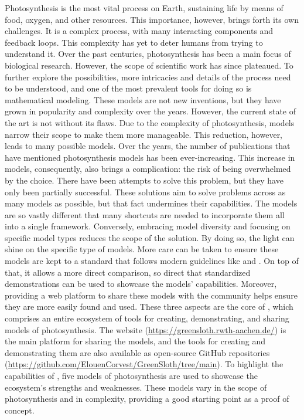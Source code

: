 Photosynthesis is the most vital process on Earth, sustaining life by means of food, oxygen, and other resources. This importance, however, brings forth its own challenges. It is a complex process, with many interacting components and feedback loops. This complexity has yet to deter humans from trying to understand it. Over the past centuries, photosynthesis has been a main focus of biological research. However, the scope of scientific work has since plateaued. To further explore the possibilities, more intricacies and details of the process need to be understood, and one of the most prevalent tools for doing so is mathematical modeling. These models are not new inventions, but they have grown in popularity and complexity over the years. However, the current state of the art is not without its flaws. Due to the complexity of photosynthesis, models narrow their scope to make them more manageable. This reduction, however, leads to many possible models. Over the years, the number of publications that have mentioned photosynthesis models has been ever-increasing. This increase in models, consequently, also brings a complication: the risk of being overwhelmed by the choice. There have been attempts to solve this problem, but they have only been partially successful. These solutions aim to solve problems across as many models as possible, but that fact undermines their capabilities. The models are so vastly different that many shortcuts are needed to incorporate them all into a single framework. Conversely, embracing model diversity and focusing on specific model types reduces the scope of the solution. By doing so, the light can shine on the specific type of models. More care can be taken to ensure these models are kept to a standard that follows modern guidelines like  and . On top of that, it allows a more direct comparison, so direct that standardized demonstrations can be used to showcase the models' capabilities. Moreover, providing a web platform to share these models with the community helps ensure they are more easily found and used. These three aspects are the core of \greensloth{}, which comprises an entire ecosystem of tools for creating, demonstrating, and sharing  models of photosynthesis. The website (\url{https://greensloth.rwth-aachen.de/}) is the main platform for sharing the models, and the tools for creating and demonstrating them are also available as open-source GitHub repositories (\url{https://github.com/ElouenCorvest/GreenSloth/tree/main}). To highlight the capabilities of \greensloth{}, five models of photosynthesis are used to showcase the ecosystem's strengths and weaknesses. These models vary in the scope of photosynthesis and in complexity, providing a good starting point as a proof of concept.